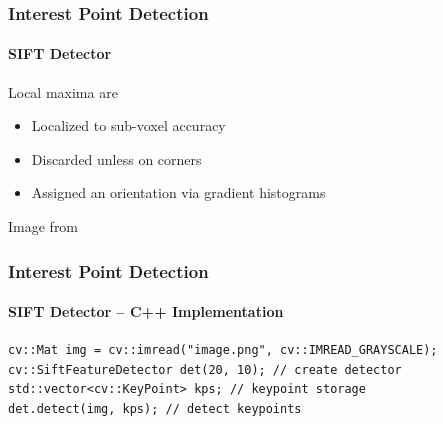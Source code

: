 \documentclass[xetex,professionalfont]{beamer}
\begin{document}

\begin{frame}
\frametitle{Interest Point Detection}
\framesubtitle{SIFT Detector}

Local maxima are
\begin{itemize}
	\item Localized to sub-voxel accuracy %
	\item Discarded unless on corners %
	\item Assigned an orientation via gradient histograms %
\end{itemize}

\begin{center}
	{\centering Image from \cite{prince12}}
\end{center}

\end{frame}


\begin{frame}[fragile]
\frametitle{Interest Point Detection}
\framesubtitle{SIFT Detector -- C++ Implementation}


\begin{verbatim}
cv::Mat img = cv::imread("image.png", cv::IMREAD_GRAYSCALE);
cv::SiftFeatureDetector det(20, 10); // create detector
std::vector<cv::KeyPoint> kps; // keypoint storage
det.detect(img, kps); // detect keypoints
\end{verbatim}

\end{frame}
\end{document}
